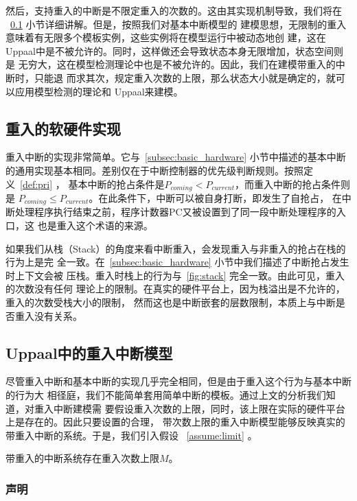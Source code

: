 然后，支持重入的中断是不限定重入的次数的。这由其实现机制导致，我们将在
~\ref{subsec:reentrant_hardware} 小节详细讲解。但是，按照我们对基本中断模型的
建模思想，无限制的重入意味着有无限多个模板实例，这些实例将在模型运行中被动态地创
建，这在Uppaal中是不被允许的。同时，这样做还会导致状态本身无限增加，状态空间则是
无穷大，这在模型检测理论中也是不被允许的。因此，我们在建模带重入的中断时，只能退
而求其次，规定重入次数的上限，那么状态大小就是确定的，就可以应用模型检测的理论和
Uppaal来建模。

\subsection{重入的软硬件实现}
\label{subsec:reentrant_hardware}

重入中断的实现非常简单。它与~\ref{subsec:basic_hardware} 小节中描述的基本中断
的通用实现基本相同。差别仅在于中断控制器的优先级判断规则。按照定义~\ref{def:pri} ，
基本中断的抢占条件是$P_{coming} < P_{current}$，而重入中断的抢占条件则是
$P_{coming} \leq P_{current}$。在此条件下，中断可以被自身打断，即发生了自抢占，
在中断处理程序执行结束之前，程序计数器PC又被设置到了同一段中断处理程序的入口，这
也是重入这个术语的来源。

如果我们从栈（Stack）的角度来看中断重入，会发现重入与非重入的抢占在栈的行为上是完
全一致。在~\ref{subsec:basic_hardware} 小节中我们描述了中断抢占发生时上下文会被
压栈。重入时栈上的行为与~\ref{fig:stack} 完全一致。由此可见，重入的次数没有任何
理论上的限制。在真实的硬件平台上，因为栈溢出是不允许的，重入的次数受栈大小的限制，
然而这也是中断嵌套的层数限制，本质上与中断是否重入没有关系。

\subsection{Uppaal中的重入中断模型}
\label{subsec:reentrant_uppaal}

尽管重入中断和基本中断的实现几乎完全相同，但是由于重入这个行为与基本中断的行为大
相径庭，我们不能简单套用简单中断的模板。通过上文的分析我们知道，对重入中断建模需
要假设重入次数的上限，同时，该上限在实际的硬件平台上是存在的。因此只要设置的合理，
带次数上限的重入中断模型能够反映真实的带重入中断的系统。于是，我们引入假设
~\ref{assume:limit} 。

\begin{assumption}
	带重入的中断系统存在重入次数上限$M$。
	\label{assume:limit}
\end{assumption}

\subsubsection{声明}
\label{subsubsec:reentrant_decl}

